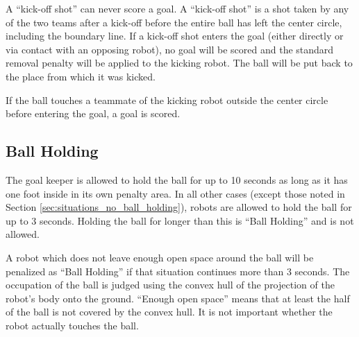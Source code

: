 \documentclass[12pt]{article}
\begin{document}
A ``kick-off shot'' can never score a goal. A ``kick-off shot'' is a shot taken by any of the two teams after a kick-off before the entire ball has left the center circle, including the boundary line. 
If a kick-off shot enters the goal (either directly or via contact with an opposing robot), no goal will be scored and the standard removal penalty will be applied to the kicking robot. The ball will be put back to the place from which it was kicked.

If the ball touches a teammate of the kicking robot outside the center circle before entering the goal, a goal is scored.

\subsection{Ball Holding}
\label{sec:ball_holding}

The goal keeper is allowed to hold the ball for up to 10 seconds as long as it has one foot inside in its own penalty area.  In all other cases (except those noted in Section \ref{sec:situations_no_ball_holding}), robots are allowed to hold the ball for up to 3 seconds. Holding the ball for longer than this is ``Ball Holding'' and is not allowed.

A robot which does not leave enough open space around the ball will be penalized as ``Ball Holding'' if that situation continues more than 3 seconds. The occupation of the ball is judged using the convex hull of the projection of the robot's body onto the ground. ``Enough open space'' means that at least the half of the ball is not covered by the convex hull. It is not important whether the robot actually touches the ball.
\end{document}
